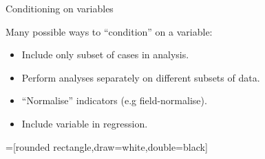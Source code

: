 \documentclass[aspectratio=169,notes=hide,compress]{beamer}
\begin{document}
\begin{frame}[c]{Conditioning on variables}

  Many possible ways to ``condition'' on a variable:
  \begin{itemize}
    \item Include only subset of cases in analysis.
    \item Perform analyses separately on different subsets of data.
    \item ``Normalise'' indicators (e.g field-normalise).
    \item Include variable in regression.
  \end{itemize}

\end{frame}

=[rounded rectangle,draw=white,double=black]
\end{document}
